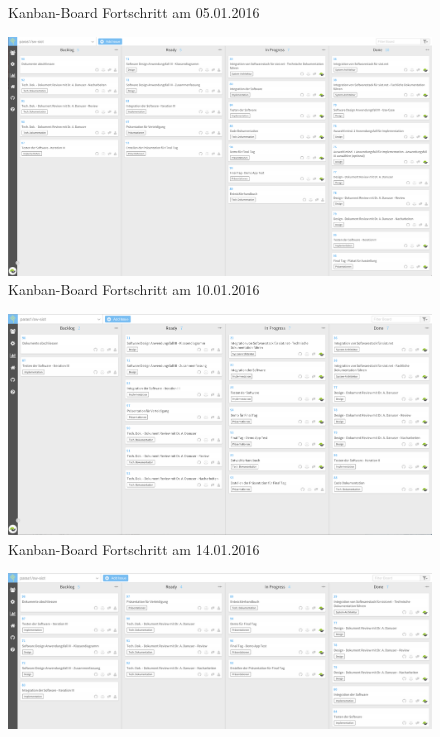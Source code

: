 \begin{landscape}
\begin{figure}[H]
  \caption[Kanban-Board 05.01.2016]{Kanban-Board Fortschritt am 05.01.2016}
\end{figure}
\begin{figure}[H]
  \centering
  \includegraphics[scale=0.37]{98_Bilder/98_Anhang/20160110_Kanban_board}
  \caption[Kanban-Board 10.01.2016]{Kanban-Board Fortschritt am 10.01.2016}
\end{figure}
\begin{figure}[H]
  \centering
  \includegraphics[scale=0.37]{98_Bilder/98_Anhang/20160114_Kanban_board}
  \caption[Kanban-Board 14.01.2016]{Kanban-Board Fortschritt am 14.01.2016}
\end{figure}
\begin{figure}[H]
  \centering
  \includegraphics[scale=0.37]{98_Bilder/98_Anhang/20160117_Kanban_board}

\end{figure}
\end{landscape}
